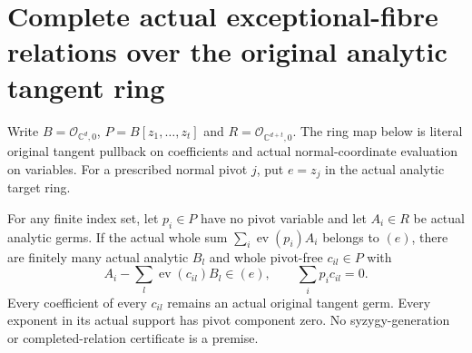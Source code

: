 \section{Complete actual exceptional-fibre relations over the original analytic tangent ring}

Write $B=\mathcal O_{\mathbb C^d,0}$, $P=B[z_1,\ldots,z_t]$ and
$R=\mathcal O_{\mathbb C^{d+t},0}$. The ring map below is literal
original tangent pullback on coefficients and actual normal-coordinate
evaluation on variables. For a prescribed normal pivot $j$, put
$e=z_j$ in the actual analytic target ring.

\begin{theorem}
\label{hir:actual-relative-exceptional-fibre-complete-polynomial-syzygies}
\leanok
For any finite index set, let $p_i\in P$ have no pivot variable and
let $A_i\in R$ be actual analytic germs. If the actual whole sum
$\sum_i\operatorname{ev}(p_i)A_i$ belongs to $(e)$, there are finitely
many actual analytic $B_l$ and whole pivot-free $c_{il}\in P$ with
\[
 A_i-\sum_l\operatorname{ev}(c_{il})B_l\in(e),\qquad
 \sum_i p_ic_{il}=0.
\]
Every coefficient of every $c_{il}$ remains an actual original tangent
germ. Every exponent in its actual support has pivot component zero.
No syzygy-generation or completed-relation certificate is a premise.
\end{theorem}
